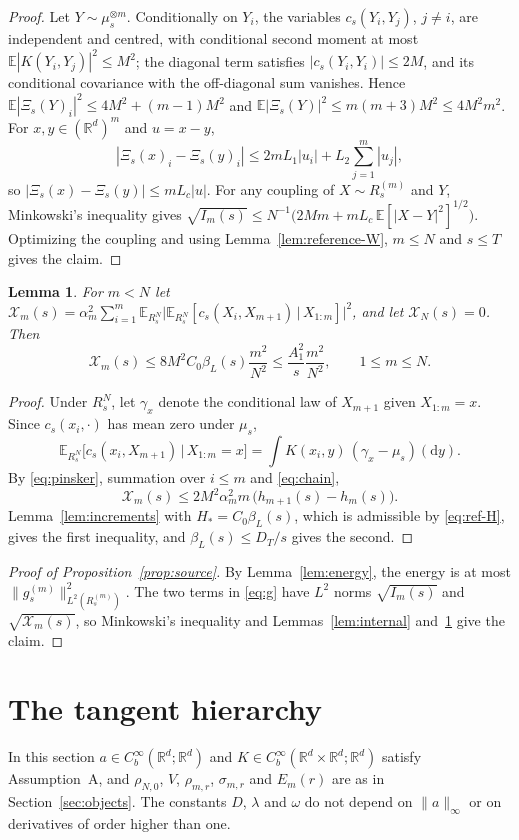 \documentclass[11pt]{amsart}
\numberwithin{equation}{section}
\theoremstyle{plain}
\newtheorem{lemma}[theorem]{Lemma}
\theoremstyle{remark}
\newcommand{\R}{\mathbb{R}}
\newcommand{\E}{\mathbb{E}}
\newcommand{\dd}{\mathrm{d}}
\begin{document}
\begin{proof}
Let $Y\sim\mu_s^{\otimes m}$. Conditionally on $Y_i$, the variables $c_s(Y_i,Y_j)$, $j\ne i$, are independent and centred, with conditional second moment at most $\E|K(Y_i,Y_j)|^2\le M^2$; the diagonal term satisfies $|c_s(Y_i,Y_i)|\le2M$, and its conditional covariance with the off-diagonal sum vanishes. Hence $\E|\Xi_s(Y)_i|^2\le4M^2+(m-1)M^2$ and $\E|\Xi_s(Y)|^2\le m(m+3)M^2\le4M^2m^2$. For $x,y\in(\R^d)^m$ and $u=x-y$,
\[
|\Xi_s(x)_i-\Xi_s(y)_i|\le2mL_1|u_i|+L_2\sum_{j=1}^m|u_j|,
\]
so $|\Xi_s(x)-\Xi_s(y)|\le mL_c|u|$. For any coupling of $X\sim R^{(m)}_s$ and $Y$, Minkowski's inequality gives $\sqrt{I_m(s)}\le N^{-1}\big(2Mm+mL_c\,\E[|X-Y|^2]^{1/2}\big)$. Optimizing the coupling and using Lemma~\ref{lem:reference-W}, $m\le N$ and $s\le T$ gives the claim.
\end{proof}

\begin{lemma}\label{lem:external}
For $m<N$ let $\mathcal X_m(s)=\alpha_m^2\sum_{i=1}^m\E_{R^N_s}\big|\E_{R^N_s}[c_s(X_i,X_{m+1})\,|\,X_{1:m}]\big|^2$, and let $\mathcal X_N(s)=0$. Then
\[
\mathcal X_m(s)\le8M^2C_0\beta_L(s)\frac{m^2}{N^2}\le\frac{A_1^2}{s}\frac{m^2}{N^2},\qquad 1\le m\le N.
\]
\end{lemma}

\begin{proof}
Under $R^N_s$, let $\gamma_x$ denote the conditional law of $X_{m+1}$ given $X_{1:m}=x$. Since $c_s(x_i,\cdot)$ has mean zero under $\mu_s$,
\[
\E_{R^N_s}\big[c_s(x_i,X_{m+1})\,\big|\,X_{1:m}=x\big]=\int K(x_i,y)\,(\gamma_x-\mu_s)(\dd y).
\]
By \eqref{eq:pinsker}, summation over $i\le m$ and \eqref{eq:chain},
\[
\mathcal X_m(s)\le2M^2\alpha_m^2m\,\big(h_{m+1}(s)-h_m(s)\big).
\]
Lemma~\ref{lem:increments} with $H_*=C_0\beta_L(s)$, which is admissible by \eqref{eq:ref-H}, gives the first inequality, and $\beta_L(s)\le D_T/s$ gives the second.
\end{proof}

\begin{proof}[Proof of Proposition~\ref{prop:source}]
By Lemma~\ref{lem:energy}, the energy is at most $\|g^{(m)}_s\|^2_{L^2(R^{(m)}_s)}$. The two terms in \eqref{eq:g} have $L^2$ norms $\sqrt{I_m(s)}$ and $\sqrt{\mathcal X_m(s)}$, so Minkowski's inequality and Lemmas~\ref{lem:internal} and~\ref{lem:external} give the claim.
\end{proof}

\section{The tangent hierarchy}\label{sec:hierarchy}
In this section $a\in C^\infty_b(\R^d;\R^d)$ and $K\in C^\infty_b(\R^d\times\R^d;\R^d)$ satisfy Assumption~A, and $\rho_{N,0}$, $V$, $\rho_{m,r}$, $\sigma_{m,r}$ and $E_m(r)$ are as in Section~\ref{sec:objects}. The constants $D$, $\lambda$ and $\omega$ do not depend on $\|a\|_\infty$ or on derivatives of order higher than one.
\end{document}
